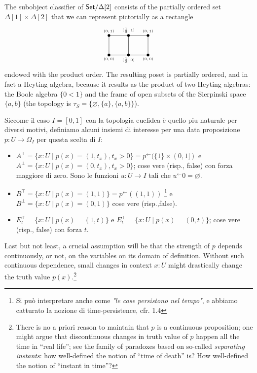 \begin{remark}
	The subobject classifier of $\mathsf{Set}/\Delta[2]$ consists of the partially ordered set $\Delta[1]\times\Delta[2]$ that we can represent pictorially as a rectangle
	\[\begin{tikzpicture}[xscale=2]
			\foreach \i/\name in {0/0,.5/{\frac{1}{2}},1/0}{
			\foreach \j/\pos in {0/below,1/above}
			\fill (\i,\j) ellipse (1pt and 2pt) node[\pos] {\tiny $(\name,\j)$};
			}
			\draw (0,0) rectangle (1,1);
			\draw (.5,1) -- (.5,0);
		\end{tikzpicture}\]
	endowed with the product order. The resulting poset is partially ordered, and in fact a Heyting algebra, because it results as the product of two Heyting algebras: the Boole algebra $\{0<1\}$ and the frame of open subsets of the Sierpinski space $\{a,b\}$ (the topology is $\tau_S = \{\varnothing, \{a\}, \{a,b\}\}$).
\end{remark}
\begin{remark}\label{alcuni_set}
	Siccome il caso $I=[0,1]$ con la topologia euclidea è quello piu naturale per diversi motivi, definiamo alcuni insiemi di interesse per una data proposizione $p : U \to \Omega_I$ per questa scelta di $I$:
	\begin{itemize}
		\item $A^\top = \{x : U \mid p(x) = (1,t_x), t_x > 0\} = p^\leftarrow(\{1\}\times (0,1])$ e $A^\perp = \{x : U \mid p(x) = (0,t_x), t_x > 0\}$; cose vere (risp., false) con forza maggiore di zero. Sono le funzioni $u : U \to I$ tali che $u^\leftarrow 0 = \varnothing$.
		\item $B^\top = \{x : U \mid p(x) = (1,1)\} = p^\leftarrow((1,1))$ \footnote{Si può interpretare anche come \emph{"le cose persistono nel tempo"}, e abbiamo catturato la nozione di time-persistence, cfr. 1.4} e $B^\perp = \{x : U \mid p(x) = (0,1)\}$ cose vere (risp.,false).
		\item $E_t^\top = \{ x : U \mid p(x)=(1,t)\}$ e $E_t^\perp = \{ x : U \mid p(x)=(0,t)\}$; cose vere (risp., false) con forza $t$.
	\end{itemize}
\end{remark}
Last but not least, a crucial assumption will be that the strength of $p$ depends continuously, or not, on the variables on its domain of definition. Without such continuous dependence, small changes in context $x : U$ might drastically change the truth value $p(x)$.\footnote{There is no a priori reason to maintain that $p$ is a continuous proposition; one might argue that discontinuous changes in truth value of $p$ happen all the time in ``real life''; see the family of paradoxes based on so-called \emph{separating instants}: how well-defined the notion of ``time of death'' is? How well-defined the notion of ``instant in time''?}
